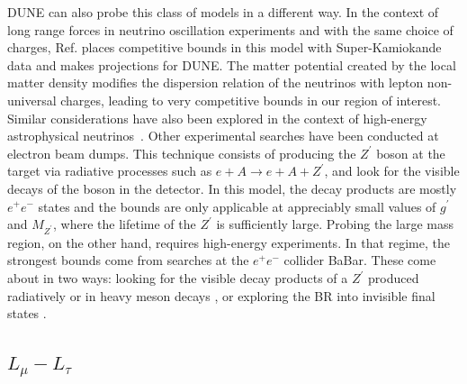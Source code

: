 %
DUNE can also probe this class of models in a different way. In the context of long range forces in neutrino oscillation experiments and with the same choice of charges, Ref. \cite{Wise:2018rnb} places competitive bounds in this model with Super-Kamiokande data and makes projections for DUNE. The matter potential created by the local matter density modifies the dispersion relation of the neutrinos with lepton non-universal charges, leading to very competitive bounds in our region of interest. Similar considerations have also been explored in the context of high-energy astrophysical neutrinos~\cite{Bustamante:2018mzu}. Other experimental searches have been conducted at electron beam dumps. This technique consists of producing the $Z^\prime$ boson at the target via radiative processes such as $e + A \to e + A + Z^\prime$, and look for the visible decays of the boson in the detector. In this model, the decay products are mostly $e^+ e^-$ states and the bounds are only applicable at appreciably small values of $g^\prime$ and $M_{Z^\prime}$, where the lifetime of the $Z^\prime$ is sufficiently large. Probing the large mass region, on the other hand, requires high-energy experiments. In that regime, the strongest bounds come from searches at the $e^+ e^-$ collider BaBar. These come about in two ways: looking for the visible decay products of a $Z^\prime$ produced radiatively or in heavy meson decays \cite{Lees:2014xha}, or exploring the BR into invisible final states \cite{Lees:2017lec}.



\subsection{\boldmath$L_\mu - L_\tau$ \label{sec:lmu_ltau}}

